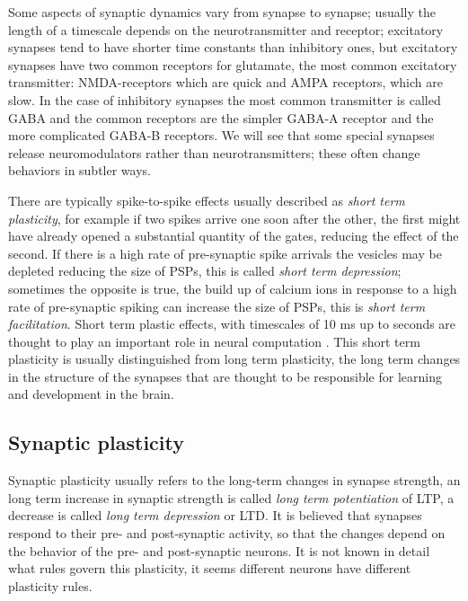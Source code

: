 \documentclass[11pt,a4paper]{scrartcl}
\begin{document}
Some aspects of synaptic dynamics vary from synapse to synapse;
usually the length of a timescale depends on the neurotransmitter and
receptor; excitatory synapses tend to have shorter time constants than
inhibitory ones, but excitatory synapses have two common receptors for
glutamate, the most common excitatory transmitter: NMDA-receptors
which are quick and AMPA receptors, which are slow. In the case of
inhibitory synapses the most common transmitter is called GABA and the
common receptors are the simpler GABA-A receptor and the more
complicated GABA-B receptors. We will see that some special synapses
release neuromodulators rather than neurotransmitters; these often
change behaviors in subtler ways.

There are typically spike-to-spike effects usually described as
\textsl{short term plasticity}, for example if two spikes arrive one
soon after the other, the first might have already opened a
substantial quantity of the gates, reducing the effect of the second.
If there is a high rate of pre-synaptic spike arrivals the vesicles
may be depleted reducing the size of PSPs, this is called
\textsl{short term depression}; sometimes the opposite is true, the
build up of calcium ions in response to a high rate of pre-synaptic
spiking can increase the size of PSPs, this is \textsl{short term
  facilitation}. Short term plastic effects, with timescales of 10 ms
up to seconds are thought to play an important role in neural
computation \cite{AbbottEtAl1997a}. This short term plasticity is
usually distinguished from long term plasticity, the long term changes
in the structure of the synapses that are thought to be responsible
for learning and development in the brain.

\subsection*{Synaptic plasticity}

Synaptic plasticity usually refers to the long-term changes in synapse
strength, an long term increase in synaptic strength is called
\textsl{long term potentiation} of LTP, a decrease is called
\textsl{long term depression} or LTD. It is believed that synapses
respond to their pre- and post-synaptic activity, so that the changes
depend on the behavior of the pre- and post-synaptic neurons. It is
not known in detail what rules govern this plasticity, it seems
different neurons have different plasticity rules. 
\end{document}
